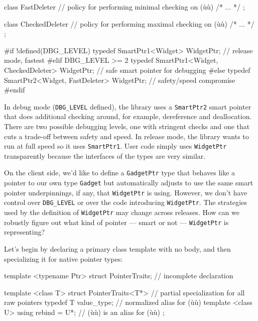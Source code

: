 \begin{emcppslisting}
class FastDeleter     // policy for performing minimal checking on (ù{}ù)
{ /* ... */ };

class CheckedDeleter        // policy for performing maximal checking on (ù{}ù)
{ /* ... */ };

#if !defined(DBG_LEVEL)
typedef SmartPtr1<Widget>
    WidgetPtr;                             // release mode, fastest
#elif DBG_LEVEL >= 2
typedef SmartPtr1<Widget, CheckedDeleter>
    WidgetPtr;                             // safe smart pointer for debugging
#else
typedef SmartPtr2<Widget, FastDeleter>
    WidgetPtr;                             // safety/speed compromise
#endif
\end{emcppslisting}
    

\noindent In debug mode (\lstinline!DBG_LEVEL! defined), the library uses a
\lstinline!SmartPtr2! smart pointer that does additional checking around,
for example, dereference and deallocation. There are two possible
debugging levels, one with stringent checks and one that cuts a
trade-off between safety and speed. In release mode, the library wants
to run at full speed so it uses \lstinline!SmartPtr1!. User code simply
uses \lstinline!WidgetPtr! transparently because the interfaces of the
types are very similar.

On the client side, we'd like to define a \lstinline!GadgetPtr! type that
behaves like a pointer to our own type \lstinline!Gadget! but automatically
adjusts to use the same smart pointer underpinnings, if any, that
\lstinline!WidgetPtr! is using. However, we don't have control over
\lstinline!DBG_LEVEL! or over the code introducing \lstinline!WidgetPtr!. The
strategies used by the definition of \lstinline!WidgetPtr! may change
across releases. How can we robustly figure out what kind of pointer ---
smart or not --- \lstinline!WidgetPtr! is representing?

Let's begin by declaring a primary class template with no body, and then
specializing it for native pointer types:

\begin{emcppslisting}
template <typename Ptr>
struct PointerTraits;       // incomplete declaration

template <class T>
struct PointerTraits<T*>   // partial specialization for all raw pointers
{
    typedef T value_type;  // normalized alias for (ù{}ù)
    template <class U>
    using rebind = U*;     // (ù{}ù) is an alias for (ù{}ù)
};
\end{emcppslisting}
    

